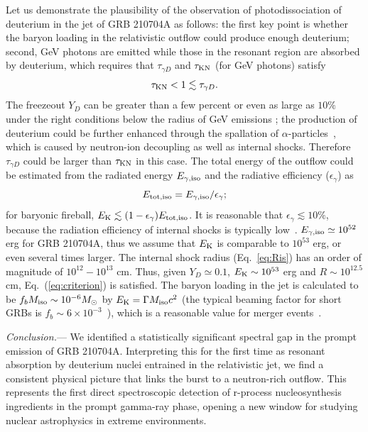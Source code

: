 \documentclass[linenumbers,twocolumn]{aastex631}
\begin{document}
Let us demonstrate
the plausibility of the observation of photodissociation of deuterium in the jet of GRB 210704A as follows: the first key point is whether the baryon loading in the relativistic outflow could produce enough deuterium;
second, GeV photons are emitted while those in the resonant region are absorbed by deuterium, which requires that $\tau_{\gamma D}$ and $\tau_{\rm KN}$ (for GeV photons) satisfy
\begin{equation}\label{eq:criterion}
    \tau_{\rm KN}<1\lesssim\tau_{\gamma D}.
\end{equation}
The freezeout $Y_{D}$ can be greater than a few percent or even as large as $10\%$ under the right conditions below the radius of GeV emissions \citep[see the simulation in][]{2002ApJ...580..368P}; the production of deuterium could be further enhanced through the spallation of $\alpha$-particles~\citep{2003ApJ...588..931B}, which is caused by neutron-ion decoupling as well as internal shocks. Therefore $\tau_{\gamma D}$ could be larger than $\tau_{\rm KN}$ in this case. The total energy of the outflow could be estimated from the radiated energy $E_{\gamma, \rm iso}$ and the radiative efficiency ($\epsilon_\gamma$) as
\begin{equation}
    E_{\rm tot, iso}= E_{\gamma, \rm iso}/\epsilon_\gamma;
\end{equation}
for baryonic fireball, $E_{\rm K}\lesssim (1-\epsilon_\gamma)E_{\rm tot, iso}$.
It is reasonable that $\epsilon_\gamma\lesssim10\%$, because the radiation efficiency of internal shocks is typically low~\citep[][]{2011ApJ...726...90Z,2008FrPhC...3..306F}. $E_{\gamma, \rm iso}\simeq 10^{52}$ erg for GRB 210704A, thus we assume that $E_{\rm K}$ is comparable to $10^{53}$ erg, or even several times larger. The internal shock radius (Eq.~\ref{eq:Ris}) has an order of magnitude of $10^{12}-10^{13}$ cm. Thus, given $Y_{D}\simeq0.1$, $E_{\rm K}\sim10^{53}$ erg and $R\sim10^{12.5}$ cm, Eq.~(\ref{eq:criterion}) is satisfied. The baryon loading in the jet is calculated to be $f_{b}M_{\rm iso}\sim10^{-6}M_{\odot}$ by $E_{\rm K}=\Gamma M_{\rm iso}c^2$ (the typical beaming factor for short GRBs is $f_b\sim6\times10^{-3}$~\citep[][]{2014ARA&A..52...43B}), which is a reasonable value for merger events~\citep{2019LRR....23....1M,2025PhRvD.111f3040S}.



\textit{Conclusion.}---
We identified a statistically significant spectral gap in the prompt emission of GRB 210704A. Interpreting this for the first time as resonant absorption by deuterium nuclei entrained in the relativistic jet, we find a consistent physical picture that links the burst to a neutron-rich outflow. This represents the first direct spectroscopic detection of r-process nucleosynthesis ingredients in the prompt gamma-ray phase, opening a new window for studying nuclear astrophysics in extreme environments.
\end{document}
